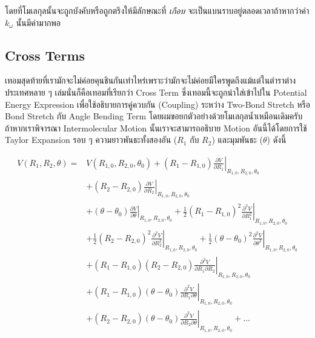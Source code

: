 \noindent โดยที่โมเลกุลนั้นจะถูกบังคับหรือถูกตรึงให้มีลักษณะที่ \textit{เกือบ} จะเป็นแบนราบอยู่ตลอดเวลาถ้าหากว่าค่า $k_{\omega}$
นั้นมีค่ามากพอ

\subsection{Cross Terms}

เทอมสุดท้ายที่เรามักจะไม่ค่อยคุนชินกันเท่าไหร่เพราะว่ามักจะไม่ค่อยมีใครพูดถึงแม้แต่ในตำราต่างประเทศหลาย ๆ เล่มนั่นก็คือเทอมที่เรียกว่า Cross Term
ซึ่งเทอมนี้จะถูกนำใส่เข้าไปใน Potential Energy Expression เพื่อใช้อธิบายการคู่ควบกัน (Coupling) ระหว่าง Two-Bond Stretch
หรือ Bond Stretch กับ Angle Bending Term โดยผมขอยกตัวอย่างด้วยโมเลกุลน้ำเหมือนเดิมครับ ถ้าหากเราพิจารณา Intermolecular Motion
นั้นเราจะสามารถอธิบาย Motion อันนี้ได้โดยการใช้ Taylor Expansion รอบ ๆ ความยาวพันธะทั้งสองอัน ($R_{1}$ กับ $R_{2}$) และมุมพันธะ
($\theta$) ดังนี้

\begin{align}
  V\left(R_1, R_2, \theta\right)
  = &
  V\left(R_{1,0}, R_{2,0}, \theta_0\right)
  + \left.\left(R_1-R_{1,0}\right) \frac{\partial V}{\partial R_1}\right|_{R_{1,0}, R_{2,0}, \theta_0} \nonumber     \\
    & + \left.\left(R_2-R_{2,0}\right) \frac{\partial V}{\partial R_2}\right|_{R_{1,0}, R_{2,0}, \theta_0} \nonumber \\
    & + \left.\left(\theta-\theta_0\right) \frac{\partial V}{\partial \theta}\right|_{R_{1,0}, R_{2,0}, \theta_0}
  + \left.\frac{1}{2}\left(R_1-R_{1,0}\right)^2
  \frac{\partial^2 V}{\partial R_1^2}\right|_{R_{1,0}, R_{2,0}, \theta_0} \nonumber                                  \\
    & + \left.\frac{1}{2}\left(R_2-R_{2,0}\right)^2
  \frac{\partial^2 V}{\partial R_2^2}\right|_{R_{1,0}, R_{2,0}, \theta_0}
  + \left.\frac{1}{2}\left(\theta-\theta_0\right)^2
  \frac{\partial^2 V}{\partial \theta^2}\right|_{R_{1,0}, R_{2,0}, \theta_0} \nonumber                               \\
    & + \left.\left(R_1-R_{1,0}\right)\left(R_2-R_{2,0}\right)
  \frac{\partial^2 V}{\partial R_1 \partial R_2}\right|_{R_{1,0}, R_{2,0}, \theta_0} \nonumber                       \\
    & + \left.\left(R_1-R_{1,0}\right)\left(\theta-\theta_0\right)
  \frac{\partial^2 V}{\partial R_1 \partial \theta}\right|_{R_{1,0}, R_{2,0}, \theta_0} \nonumber                    \\
    & + \left.\left(R_2-R_{2,0}\right)\left(\theta-\theta_0\right)
  \frac{\partial^2 V}{\partial R_2 \partial \theta}\right|_{R_{1,0}, R_{2,0}, \theta_0} + \ldots
\end{align}


